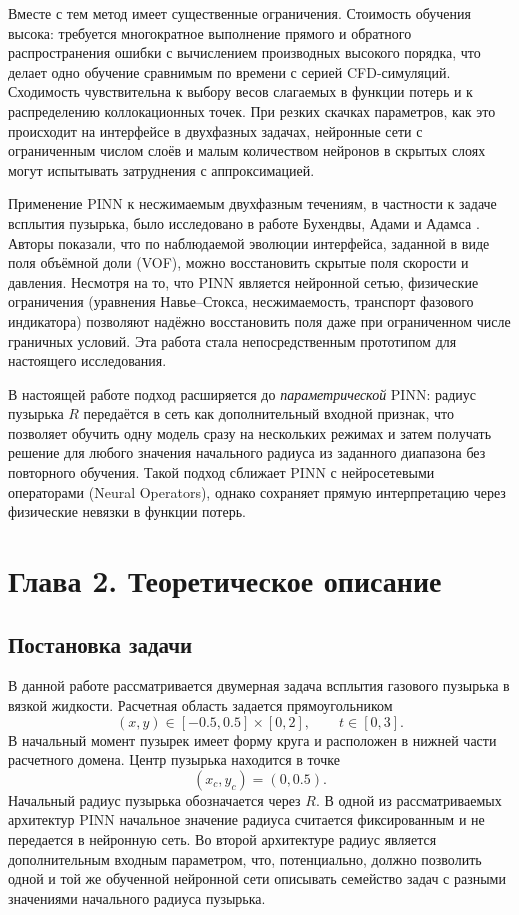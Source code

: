 \documentclass[12pt,a4paper]{article}
\begin{document}
Вместе с тем метод имеет существенные ограничения. Стоимость обучения высока:
требуется многократное выполнение прямого и обратного распространения ошибки с вычислением
производных высокого порядка, что делает одно обучение сравнимым по времени
с серией CFD-симуляций. Сходимость чувствительна к выбору весов слагаемых в функции потерь и к
распределению коллокационных точек. При резких скачках параметров, как это
происходит на интерфейсе в двухфазных задачах, нейронные сети с
ограниченным числом слоёв и малым количеством нейронов в скрытых слоях могут испытывать затруднения с
аппроксимацией.

Применение PINN к несжимаемым двухфазным течениям, в частности к задаче
всплытия пузырька, было исследовано в работе Бухендвы, Адами и Адамса
\cite{Buhendwa2021}. Авторы показали, что по наблюдаемой эволюции интерфейса,
заданной в виде поля объёмной доли (VOF), можно восстановить скрытые поля
скорости и давления. Несмотря на то, что PINN является нейронной сетью,
физические ограничения (уравнения Навье--Стокса, несжимаемость,
транспорт фазового индикатора) позволяют надёжно восстановить поля даже
при ограниченном числе граничных условий. Эта работа стала непосредственным
прототипом для настоящего исследования.

В настоящей работе подход расширяется до \emph{параметрической} PINN: радиус
пузырька $R$ передаётся в сеть как дополнительный входной признак, что
позволяет обучить одну модель сразу на нескольких режимах и затем получать
решение для любого значения начального радиуса из заданного диапазона без повторного обучения.
Такой подход сближает PINN с нейросетевыми операторами (Neural Operators),
однако сохраняет прямую интерпретацию через физические невязки в функции
потерь.

\section{Глава 2. Теоретическое описание}

\subsection{Постановка задачи}

В данной работе рассматривается двумерная задача всплытия газового пузырька в
вязкой жидкости. Расчетная область задается прямоугольником
\[
    (x,y)\in[-0.5,0.5]\times[0,2],
    \qquad
    t\in[0,3].
\]
В начальный момент пузырек имеет форму круга и расположен в нижней части
расчетного домена. Центр пузырька находится в точке
\[
    (x_c,y_c)=(0,0.5).
\]
Начальный радиус пузырька обозначается через \(R\). В одной из рассматриваемых архитектур PINN 
начальное значение радиуса считается фиксированным и не передается в нейронную
сеть. Во второй архитектуре радиус является дополнительным входным параметром,
что, потенциально, должно позволить одной и той же обученной нейронной сети описывать семейство задач с разными значениями начального радиуса пузырька.
\end{document}
